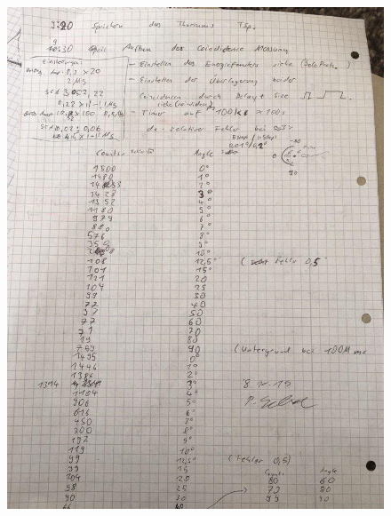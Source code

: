 \begin{figure}[h]
	\centering
	\includegraphics[scale=0.5,angle=-90]{Bilder/Anhang/protokoll_2}
\end{figure}

